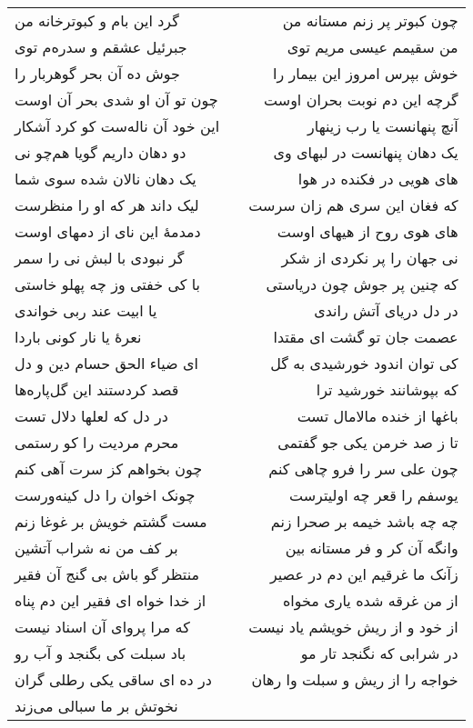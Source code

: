 \begin{center}
\begin{longtable}{l p{0.5cm} r}
گرد این بام و کبوترخانه من
&&
چون کبوتر پر زنم مستانه من
\\
جبرئیل عشقم و سدره‌م توی
&&
من سقیمم عیسی مریم توی
\\
جوش ده آن بحر گوهربار را
&&
خوش بپرس امروز این بیمار را
\\
چون تو آن او شدی بحر آن اوست
&&
گرچه این دم نوبت بحران اوست
\\
این خود آن ناله‌ست کو کرد آشکار
&&
آنچ پنهانست یا رب زینهار
\\
دو دهان داریم گویا هم‌چو نی
&&
یک دهان پنهانست در لبهای وی
\\
یک دهان نالان شده سوی شما
&&
های هویی در فکنده در هوا
\\
لیک داند هر که او را منظرست
&&
که فغان این سری هم زان سرست
\\
دمدمهٔ این نای از دمهای اوست
&&
های هوی روح از هیهای اوست
\\
گر نبودی با لبش نی را سمر
&&
نی جهان را پر نکردی از شکر
\\
با کی خفتی وز چه پهلو خاستی
&&
که چنین پر جوش چون دریاستی
\\
یا ابیت عند ربی خواندی
&&
در دل دریای آتش راندی
\\
نعرهٔ یا نار کونی باردا
&&
عصمت جان تو گشت ای مقتدا
\\
ای ضیاء الحق حسام دین و دل
&&
کی توان اندود خورشیدی به گل
\\
قصد کردستند این گل‌پاره‌ها
&&
که بپوشانند خورشید ترا
\\
در دل که لعلها دلال تست
&&
باغها از خنده مالامال تست
\\
محرم مردیت را کو رستمی
&&
تا ز صد خرمن یکی جو گفتمی
\\
چون بخواهم کز سرت آهی کنم
&&
چون علی سر را فرو چاهی کنم
\\
چونک اخوان را دل کینه‌ورست
&&
یوسفم را قعر چه اولیترست
\\
مست گشتم خویش بر غوغا زنم
&&
چه چه باشد خیمه بر صحرا زنم
\\
بر کف من نه شراب آتشین
&&
وانگه آن کر و فر مستانه بین
\\
منتظر گو باش بی گنج آن فقیر
&&
زآنک ما غرقیم این دم در عصیر
\\
از خدا خواه ای فقیر این دم پناه
&&
از من غرقه شده یاری مخواه
\\
که مرا پروای آن اسناد نیست
&&
از خود و از ریش خویشم یاد نیست
\\
باد سبلت کی بگنجد و آب رو
&&
در شرابی که نگنجد تار مو
\\
در ده ای ساقی یکی رطلی گران
&&
خواجه را از ریش و سبلت وا رهان
\\
نخوتش بر ما سبالی می‌زند

\end{longtable}
\end{center}
